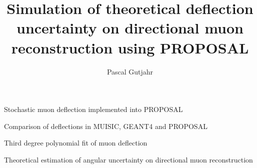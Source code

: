 \documentclass[preprint,12pt]{elsarticle}
\begin{document}
\begin{frontmatter}



\title{Simulation of theoretical deflection uncertainty on directional 
muon reconstruction using PROPOSAL}


\author[TUDortmund]{Pascal Gutjahr}


\begin{abstract}

\end{abstract}

\begin{graphicalabstract}
\end{graphicalabstract}

\begin{highlights}
\item Stochastic muon deflection implemented into PROPOSAL
\item Comparison of deflections in MUISIC, GEANT4 and PROPOSAL
\item Third degree polynomial fit of muon deflection 
\item Theoretical estimation of angular uncertainty on directional muon reconstruction 
\end{highlights}


\end{frontmatter}
\end{document}
